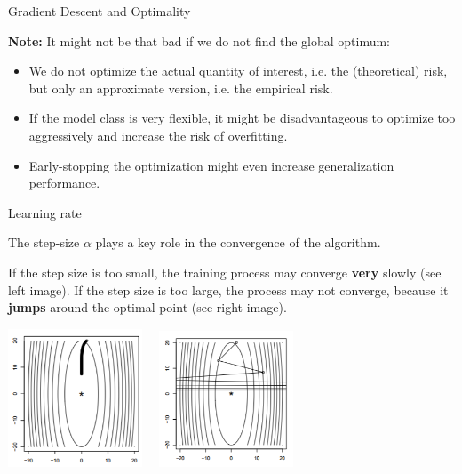\begin{vbframe}{Gradient Descent and Optimality}
  \framebreak 

  \textbf{Note: } It might not be that bad if we do not find the global optimum:  

  \begin{itemize}
    \item We do not optimize the actual quantity of interest, i.e. the (theoretical) risk, but only an approximate version, i.e. the empirical risk. 
    \item If the model class is very flexible, it might be disadvantageous to optimize too aggressively and increase the risk of overfitting. 
    \item Early-stopping the optimization might even increase generalization performance. 
  \end{itemize}

\end{vbframe}



\begin{vbframe}{Learning rate}

The step-size $\alpha$ plays a key role in the convergence of the algorithm.
\lz

If the step size is too small, the training process may converge \textbf{very} slowly (see left image). If the step size is too large, the process may not converge, because it \textbf{jumps} around the optimal point (see right image).

\begin{center}
\includegraphics[width = 0.3\textwidth]{plots/stepsize_small.png}~~
\includegraphics[width = 0.3\textwidth]{plots/stepsize_large.png}
\end{center}

\end{vbframe}

